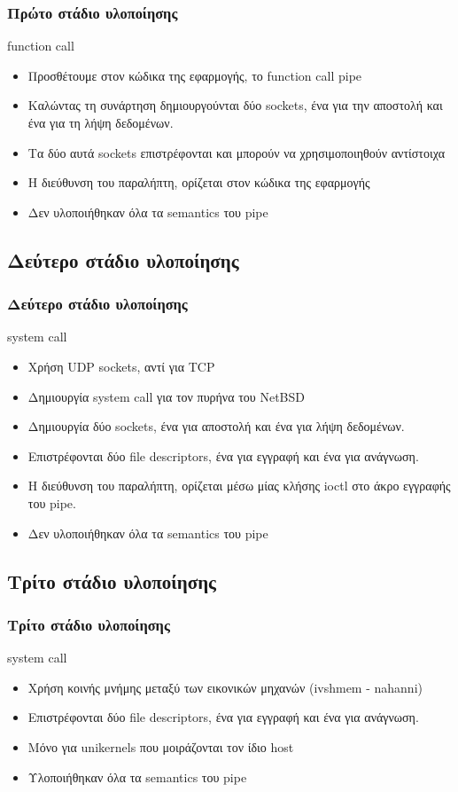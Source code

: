 \documentclass[red,slidestop,notes,compress,mathserif]{beamer}
\begin{document}
\begin{frame}
\frametitle{Πρώτο στάδιο υλοποίησης}
\begin{block}{function call}
\begin{itemize}
\item Προσθέτουμε στον κώδικα της εφαρμογής, το function call pipe
\item Καλώντας τη συνάρτηση δημιουργούνται δύο sockets, ένα για την αποστολή και ένα για τη λήψη δεδομένων. 
\item Τα δύο αυτά sockets επιστρέφονται και μπορούν να χρησιμοποιηθούν αντίστοιχα
\item Η διεύθυνση του παραλήπτη, ορίζεται στον κώδικα της εφαρμογής
\item Δεν υλοποιήθηκαν όλα τα semantics του pipe 
\end{itemize}
\end{block}
\end{frame}

\subsection{Δεύτερο στάδιο υλοποίησης}

\begin{frame}
\frametitle{Δεύτερο στάδιο υλοποίησης}
\begin{block}{system call}
\begin{itemize}
\item Χρήση UDP sockets, αντί για TCP
\item Δημιουργία system call για τον πυρήνα του NetBSD
\item Δημιουργία δύο sockets, ένα για αποστολή και ένα για λήψη δεδομένων.
\item Επιστρέφονται δύο file descriptors, ένα για εγγραφή και ένα για ανάγνωση.
\item Η διεύθυνση του παραλήπτη, ορίζεται μέσω μίας κλήσης ioctl στο άκρο εγγραφής του pipe.
\item Δεν υλοποιήθηκαν όλα τα semantics του pipe 
\end{itemize}
\end{block}
\end{frame}

\subsection{Τρίτο στάδιο υλοποίησης}
\begin{frame}
\frametitle{Τρίτο στάδιο υλοποίησης}
\begin{block}{system call}
\begin{itemize}
\item Χρήση κοινής μνήμης μεταξύ των εικονικών μηχανών (ivshmem - nahanni)
\item Επιστρέφονται δύο file descriptors, ένα για εγγραφή και ένα για ανάγνωση.
\item Μόνο για unikernels που μοιράζονται τον ίδιο host
\item Υλοποιήθηκαν όλα τα semantics του pipe 
\end{itemize}
\end{block}
\end{frame}
\end{document}
